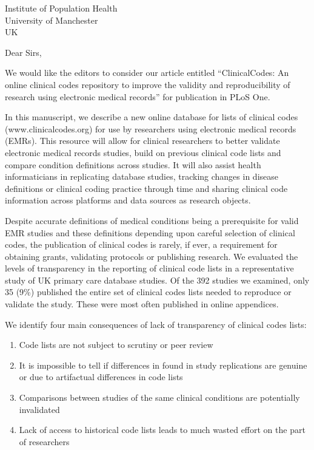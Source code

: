 \documentclass{letter}
\begin{document}
\begin{letter}{Institute of Population Health \\ University of Manchester \\ UK}
\opening{Dear Sirs,}

We would like the editors to consider our article entitled ``ClinicalCodes: An online clinical codes repository to improve the validity and reproducibility of research using electronic medical records'' for publication in PLoS One.

In this manuscript, we describe a new online database for lists of clinical codes (www.clinicalcodes.org) for use by researchers using electronic medical records (EMRs).  This resource will allow for clinical researchers to better validate electronic medical records studies, build on previous clinical code lists and compare condition definitions across studies. It will also assist health informaticians in replicating database studies, tracking changes in disease definitions or clinical coding practice through time and sharing clinical code information across platforms and data sources as research objects. 

Despite accurate definitions of medical conditions being a prerequisite for valid EMR studies and these definitions depending upon careful selection of clinical codes, the publication of clinical codes is rarely, if ever, a requirement for obtaining grants, validating protocols or publishing research.  We evaluated the levels of transparency in the reporting of clinical code lists in a representative study of UK primary care database studies.  Of the 392 studies we examined, only 35 (9\%) published the entire set of clinical codes lists needed to reproduce or validate the study. These were most often published in online appendices.

We identify four main consequences of lack of transparency of clinical codes lists:

\begin{enumerate}
    \item Code lists are not subject to scrutiny or peer review
    \item It is impossible to tell if differences in found in study replications are genuine or due to artifactual differences in code lists
    \item Comparisons between studies of the same clinical conditions are potentially invalidated
    \item Lack of access to historical code lists leads to much wasted effort on the part of researchers
\end{enumerate}



\end{letter}
\end{document}
